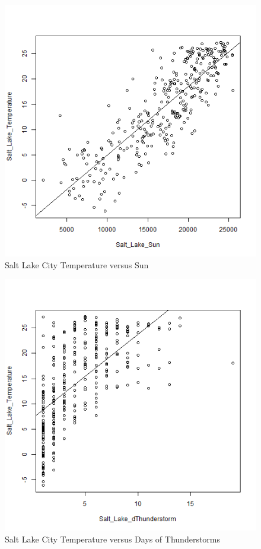 \begin{figure}
  \centering
  \includegraphics[width=15cm]{../data/img/Temp_vs_sun.PNG}
  \caption{Salt Lake City Temperature versus Sun}
  \label{fig:temp_vs_sun}
\end{figure}

\begin{figure}
  \centering
  \includegraphics[width=15cm]{../data/img/Temp_vs_dThunderstorm.PNG}
  \caption{Salt Lake City Temperature versus Days of Thunderstorms}
  \label{fig:temp_vs_dthunderstorms}
\end{figure}

